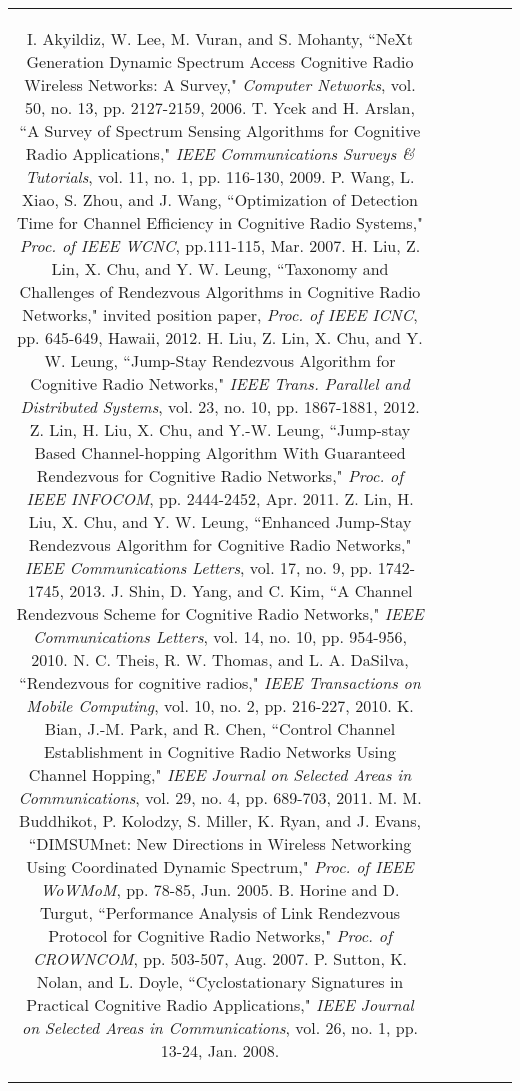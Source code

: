 \documentclass[journal]{IEEEtran}
\begin{document}
\begin{table*}
\begin{tabular}{|c|c|c|c|c|c|}
{\begin{thebibliography}{1}
\bibitem{IEEEhowto:kopka}
I. Akyildiz, W. Lee, M. Vuran, and S. Mohanty, ``NeXt Generation Dynamic Spectrum Access Cognitive Radio Wireless Networks: A Survey," \emph{Computer Networks}, vol. 50, no. 13, pp. 2127-2159, 2006.
\bibitem{IEEEhowto:kopka}
T. Ycek and H. Arslan, ``A Survey of Spectrum Sensing Algorithms for Cognitive Radio Applications," \emph{IEEE Communications Surveys \& Tutorials}, vol. 11, no. 1, pp. 116-130, 2009.
\bibitem{IEEEhowto:kopka}
P. Wang, L. Xiao, S. Zhou, and J. Wang, ``Optimization of Detection Time for Channel Efficiency in Cognitive Radio Systems," \emph{Proc. of IEEE WCNC}, pp.111-115, Mar. 2007.
\bibitem{IEEEhowto:kopka}
H. Liu, Z. Lin, X. Chu, and Y. W. Leung, ``Taxonomy and Challenges of Rendezvous Algorithms in Cognitive Radio Networks," invited position paper, \emph{Proc. of IEEE ICNC}, pp. 645-649, Hawaii, 2012.
\bibitem{IEEEhowto:kopka}
H. Liu,  Z. Lin,  X. Chu, and Y. W. Leung, ``Jump-Stay Rendezvous Algorithm for Cognitive Radio Networks," \emph{IEEE Trans. Parallel and Distributed  Systems}, vol. 23, no. 10, pp. 1867-1881, 2012.
\bibitem{IEEEhowto:kopka}
Z. Lin, H. Liu, X. Chu, and Y.-W. Leung, ``Jump-stay Based Channel-hopping Algorithm With Guaranteed Rendezvous for Cognitive Radio Networks," \emph{Proc. of IEEE INFOCOM}, pp. 2444-2452, Apr. 2011.
\bibitem{IEEEhowto:kopka}
Z. Lin,  H. Liu,  X. Chu, and Y. W. Leung, ``Enhanced Jump-Stay Rendezvous Algorithm for Cognitive Radio Networks," \emph{IEEE Communications Letters}, vol. 17, no. 9, pp. 1742-1745, 2013.
\bibitem{IEEEhowto:kopka}
J. Shin, D. Yang, and C. Kim, ``A Channel Rendezvous Scheme for Cognitive Radio Networks," \emph{IEEE Communications Letters}, vol. 14, no. 10, pp. 954-956, 2010.
\bibitem{IEEEhowto:kopka}
N. C. Theis, R. W. Thomas, and L. A. DaSilva, ``Rendezvous for cognitive radios," \emph{IEEE Transactions on Mobile Computing}, vol. 10, no. 2, pp. 216-227, 2010.
\bibitem{IEEEhowto:kopka}
K. Bian, J.-M. Park, and R. Chen, ``Control Channel Establishment in Cognitive Radio Networks Using Channel Hopping," \emph{IEEE Journal on Selected Areas in Communications}, vol. 29, no. 4, pp. 689-703, 2011.
\bibitem{IEEEhowto:kopka}
M. M. Buddhikot, P. Kolodzy, S. Miller, K. Ryan, and J. Evans, ``DIMSUMnet: New Directions in Wireless Networking Using Coordinated Dynamic Spectrum," \emph{Proc. of IEEE WoWMoM}, pp. 78-85, Jun. 2005.
\bibitem{IEEEhowto:kopka}
B. Horine and D. Turgut, ``Performance Analysis of Link Rendezvous Protocol for Cognitive Radio Networks," \emph{Proc. of CROWNCOM}, pp. 503-507, Aug. 2007.
\bibitem{IEEEhowto:kopka}
P. Sutton, K. Nolan, and L. Doyle, ``Cyclostationary Signatures in Practical Cognitive Radio Applications," \emph{IEEE Journal on Selected Areas in Communications}, vol. 26, no. 1, pp. 13-24, Jan. 2008.

\end{thebibliography}}
\end{tabular}
\end{table*}
\end{document}
